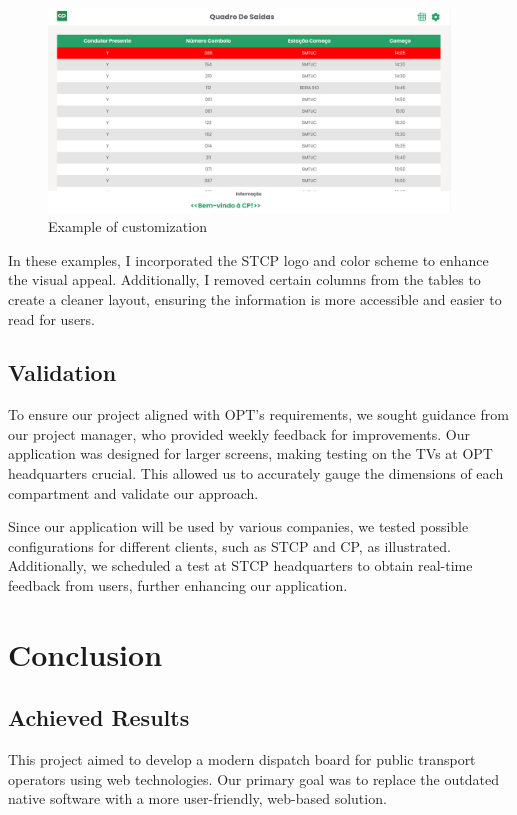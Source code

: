 \documentclass[10pt]{article}
\begin{document}
        \begin{figure}[H]
            \centering
            \includegraphics[width=0.95\textwidth]{table_of_exits_cp}
            \caption{Example of customization}
            \label{fig:table_of_exits_stcp1_}
        \end{figure}


        In these examples, I incorporated the STCP logo and color scheme to enhance the visual appeal.
        Additionally, I removed certain columns from the tables to create a cleaner layout, ensuring the information is more accessible and easier to read for users.

        \subsection{Validation}

        To ensure our project aligned with OPT's requirements, we sought guidance from our project manager, who provided weekly feedback for improvements. Our application was designed for larger screens, making testing on the TVs at OPT headquarters crucial. This allowed us to accurately gauge the dimensions of each compartment and validate our approach. 
        
        Since our application will be used by various companies, we tested possible configurations for different clients, such as STCP and CP, as illustrated. Additionally, we scheduled a test at STCP headquarters to obtain real-time feedback from users, further enhancing our application.


        \section{Conclusion}


        \subsection{Achieved Results}
        This project aimed to develop a modern dispatch board for public transport operators using web technologies. Our primary goal was to replace the outdated native software with a more user-friendly, web-based solution. 
\end{document}
